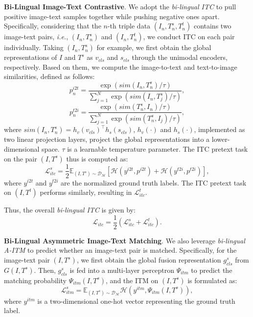 \documentclass[10pt,journal,compsoc]{IEEEtran}
\begin{document}
\textbf{Bi-Lingual Image-Text Contrastive}. 
We adopt the \emph{bi-lingual ITC} to pull positive image-text samples together while pushing negative ones apart.
Specifically, considering that the \(n\)-th triple data \((I_n, T^s_n, T^t_n)\) contains two image-text pairs, \emph{i.e.}, \((I_n, T^s_n)\) and \((I_n, T^t_n)\), we conduct ITC on each pair individually.
Taking \((I_n, T^s_n)\) for example, we first obtain the global representations of \(I\) and \(T^s\) as \(v_{cls}\) and \(s_{cls}\) through the unimodal encoders, respectively. 
Based on them, we compute the image-to-text and text-to-image similarities, defined as follows:
\begin{equation} \label{eq:10}
    p^{i2t}_n = \frac{\exp(sim(I_n, T^{s}_n) / \tau)}{\sum^{N}_{j=1} \exp(sim(I_n, T^{s}_j) / \tau)},
\end{equation}
\begin{equation} \label{eq:11}
    p^{t2i}_n = \frac{\exp(sim(T^{s}_n, I_n) / \tau)}{\sum^{N}_{j=1} \exp(sim(T^{s}_n, I_j) / \tau)},
\end{equation}
where \( sim(I_n, T^{s}_n) = {h_{v}(v_{cls})}^{\top} h_{s}(s_{cls}) \), \(h_v(\cdot)\) and \(h_s(\cdot)\), implemented as two linear projection layers, project the global representations into a lower-dimensional space. \( \tau \) is a learnable temperature parameter.
The ITC pretext task on the pair \((I, T^s)\) thus is computed as:
\begin{equation} \label{eq:9}
    \mathcal{L}^{s}_{itc} = \frac{1}{2} \mathbb{E}_{(I, T^{s}) \sim \mathcal{D}_\mathcal{M}} \left[ \mathcal{H}(y^{i2t}, p^{i2t}) + \mathcal{H}(y^{t2i}, p^{t2i}) \right],
\end{equation}
where \( y^{i2t} \) and \( y^{t2i} \) are the normalized ground truth labels. 
The ITC pretext task on \((I, T^t)\) performs similarly, resulting in \(\mathcal{L}^{t}_{itc}\).

Thus, the overall \emph{bi-lingual ITC} is given by:
\begin{equation}
    \mathcal{L}_{itc} = \frac{1}{2} (\mathcal{L}^{s}_{itc} + \mathcal{L}^{t}_{itc}).
\end{equation}

\textbf{Bi-Lingual Asymmetric Image-Text Matching}. 
We also leverage \emph{bi-lingual A-ITM} to predict whether an image-text pair is matched.
Specifically, for the image-text pair \((I, T^s)\), we first obtain the global fusion representation \(g^{s}_{cls}\) from \(G(I, T^s)\).
Then, \(g^{s}_{cls}\) is fed into a multi-layer perceptron \(\Psi_{itm}\) to predict the matching probability \(\Psi_{itm} (I, T^s)\), and the ITM on \((I, T^s)\) is formulated as:
\begin{equation}
    \mathcal{L}^{s}_{itm} = \mathbb{E}_{(I,T^{s}) \sim \mathcal{D}_\mathcal{M}} \mathcal{H}(y^{itm}, \Psi_{itm} (I, T^{s})),
\label{eq: 12}
\end{equation}
where $y^{itm}$ is a two-dimensional one-hot vector representing the ground truth label.
\end{document}
